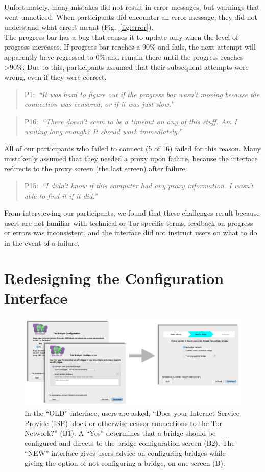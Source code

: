 \documentclass[USenglish,oneside,twocolumn]{article}
\newcommand{\pquote}[2]{
\begin{quotation}
\noindent #1:~\textit{``#2''}
\end{quotation}
}
\begin{document}
Unfortunately, many mistakes did not result in error messages, but warnings that went unnoticed.
When participants did encounter an error message, they did not understand what errors meant (Fig.~\ref{fig:error}).\\

The progress bar has a bug that causes it to update only when the level of progress increases.
If progress bar reaches a 90\% and fails, the next attempt will apparently have regressed to 0\% and remain there until the progress reaches >90\%. Due to this, participants assumed that their subsequent attempts were wrong, even if they were correct.
\pquote{P1}{It was hard to figure out if the progress bar wasn't moving because the connection was censored, or if it was just slow.}
\pquote{P16}{There doesn't seem to be a timeout on any of this stuff. Am I waiting long enough? It should work immediately.}

All of our participants who failed to connect (5 of 16) failed for this reason. Many mistakenly assumed that they needed a proxy upon failure, because the interface redirects to the proxy screen (the last screen) after failure. 

\pquote{P15}{I didn't know if this computer had any proxy information. I wasn't able to find it if it did.}

From interviewing our participants, we found that these challenges result because users are not familiar with technical or Tor-specific terms, feedback on progress or errors was inconsistent, and the interface did not instruct users on what to do in the event of a failure. 

\section{Redesigning the Configuration Interface}
\label{redesign} 

 \begin{figure}[t]
	\centering
		\includegraphics[width=.8\textwidth]{bridge-screens.pdf} 
		\caption{In the ``OLD'' interface, users are asked, ``Does your Internet Service Provide (ISP) block or 
		otherwise censor connections to the Tor Network?'' (B1). A ``Yes'' determines that a bridge should 
		be configured and directs to the bridge configuration screen (B2). 
		The ``NEW'' interface gives users advice on configuring bridges
		while giving the option of not configuring a bridge, on one screen (B).} 
\end{figure} 
\end{document}
